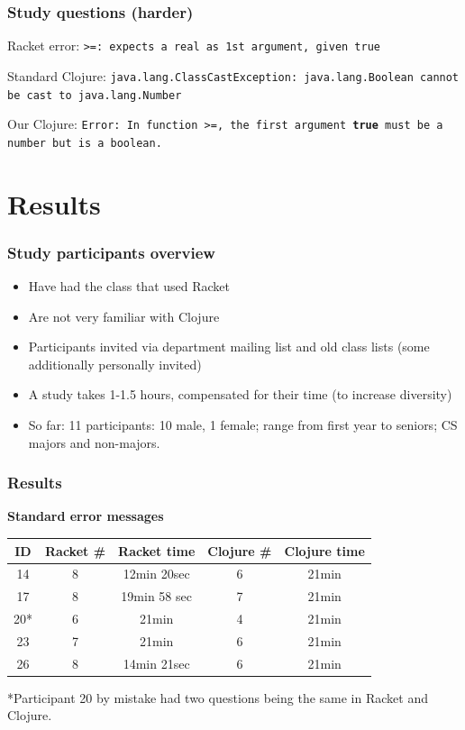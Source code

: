 \documentclass{beamer}
\newcommand{\comment}[1]{{\bf \tt  {#1}}}
\newcommand{\emcomment}[1]{\textcolor{ForestGreen}{\comment{Elena: {#1}}}}
\begin{document}
\begin{frame}[fragile]
\frametitle{Study questions (harder)}
Racket error: {\tt >=: expects a real as 1st argument, given true}

\vspace*{.2in}

Standard Clojure: {\tt java.lang.ClassCastException: java.lang.Boolean cannot be cast to java.lang.Number}

\vspace*{.2in}

Our Clojure: {\tt Error: In function >=, the first argument {\bf true}  must be a number but is a boolean.}
\end{frame}

\section{Results}

\begin{frame}
\frametitle{Study participants overview}
\begin{itemize}
\item Have had the class that used Racket
\item Are not very familiar with Clojure 
\item Participants invited via department mailing list and old class lists (some additionally personally invited)
\item A study takes 1-1.5 hours, compensated for their time (to increase diversity)
\item So far: 11 participants: 10 male, 1 female; range from first year to seniors; CS majors and non-majors.  
\end{itemize}
\end{frame}

\begin{frame}
\frametitle{Results}
{\bf Standard error messages} 
\vspace{0.1in}

\begin{tabular}{c | c| c| c | c }
\hline
{\bf ID} & {\bf Racket  \#} & {\bf Racket time} & {\bf Clojure  \#} & {\bf Clojure time} \\
\hline 
14 &  8 & 12min 20sec &  6  &  21min \\
17 &  8 & 19min 58 sec &  7 &  21min \\
20* &  6 & 21min &  4 &  21min \\
23 &  7 & 21min &  6  &  21min \\
26 &  8 & 14min 21sec &  6 &  21min \\
\hline
\end{tabular}

*Participant 20 by mistake had two questions being the same in Racket and Clojure. 
\end{frame}
\end{document}
